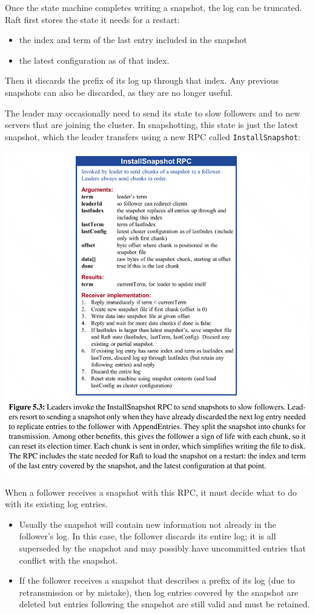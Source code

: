 \documentclass[11pt]{article}
\begin{document}
Once the state machine completes writing a snapshot, the log can be truncated. Raft first stores the
state it needs for a restart:
\begin{itemize}
\item the index and term of the last entry included in the snapshot
\item the latest configuration as of that index.
\end{itemize}
Then it discards the prefix of its log up through that index. Any previous snapshots can also be
discarded, as they are no longer useful.


The leader may occasionally need to send its state to slow followers and to new servers that are
joining the cluster. In snapshotting, this state is just the latest snapshot, which the leader
transfers using a new RPC called \texttt{InstallSnapshot}:
\begin{center}
\includegraphics[width=.99\textwidth]{../../images/papers/25.png}
\label{}
\end{center}
When a follower receives a snapshot with this RPC, it must decide what to do with its existing log
entries.
\begin{itemize}
\item Usually the snapshot will contain new information not already in the follower’s log. In this case,
the follower discards its entire log; it is all superseded by the snapshot and may possibly have
uncommitted entries that conflict with the snapshot.
\item If the follower receives a snapshot that describes a prefix of its log (due to retransmission or by
mistake), then log entries covered by the snapshot are deleted but entries following the snapshot
are still valid and must be retained.
\end{itemize}
\end{document}
